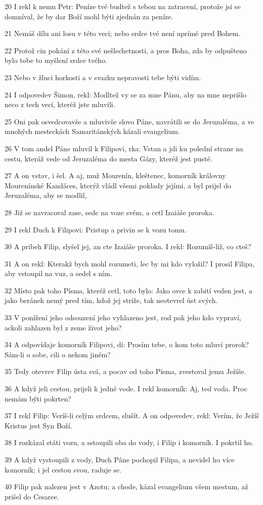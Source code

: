 \par 20 I rekl k nemu Petr: Peníze tvé budtež s tebou na zatracení, protože jsi se domníval, že by dar Boží mohl býti zjednán za peníze.
\par 21 Nemáš dílu ani losu v této veci; nebo srdce tvé není uprímé pred Bohem.
\par 22 Protož cin pokání z této své nešlechetnosti, a pros Boha, zda by odpušteno bylo tobe to myšlení srdce tvého.
\par 23 Nebo v žluci horkosti a v svazku nepravosti tebe býti vidím.
\par 24 I odpovedev Šimon, rekl: Modltež vy se za mne Pánu, aby na mne neprišlo neco z tech vecí, kteréž jste mluvili.
\par 25 Oni pak osvedcovavše a mluvivše slovo Páne, navrátili se do Jeruzaléma, a ve mnohých mesteckách Samaritánských kázali evangelium.
\par 26 V tom andel Páne mluvil k Filipovi, rka: Vstan a jdi ku polední strane na cestu, kteráž vede od Jeruzaléma do mesta Gázy, kteréž jest pusté.
\par 27 A on vstav, i šel. A aj, muž Mourenín, kleštenec, komorník královny Mourenínské Kandáces, kterýž vládl všemi poklady jejími, a byl prijel do Jeruzaléma, aby se modlil,
\par 28 Již se navracoval zase, sede na voze svém, a cetl Izaiáše proroka.
\par 29 I rekl Duch k Filipovi: Pristup a privin se k vozu tomu.
\par 30 A pribeh Filip, slyšel jej, an cte Izaiáše proroka. I rekl: Rozumíš-liž, co cteš?
\par 31 A on rekl: Kterakž bych mohl rozumeti, lec by mi kdo vyložil? I prosil Filipa, aby vstoupil na vuz, a sedel s ním.
\par 32 Místo pak toho Písma, kteréž cetl, toto bylo: Jako ovce k zabití veden jest, a jako beránek nemý pred tím, kdož jej striže, tak neotevrel úst svých.
\par 33 V ponížení jeho odsouzení jeho vyhlazeno jest, rod pak jeho kdo vypraví, ackoli zahlazen byl z zeme život jeho?
\par 34 A odpovídaje komorník Filipovi, dí: Prosím tebe, o kom toto mluví prorok? Sám-li o sobe, cili o nekom jiném?
\par 35 Tedy otevrev Filip ústa svá, a pocav od toho Písma, zvestoval jemu Ježíše.
\par 36 A když jeli cestou, prijeli k jedné vode. I rekl komorník: Aj, ted voda. Proc nemám býti pokrten?
\par 37 I rekl Filip: Veríš-li celým srdcem, slušít. A on odpovedev, rekl: Verím, že Ježíš Kristus jest Syn Boží.
\par 38 I rozkázal státi vozu, a sstoupili oba do vody, i Filip i komorník. I pokrtil ho.
\par 39 A když vystoupili z vody, Duch Páne pochopil Filipa, a nevidel ho více komorník; i jel cestou svou, raduje se.
\par 40 Filip pak nalezen jest v Azotu; a chode, kázal evangelium všem mestum, až prišel do Cesaree.

